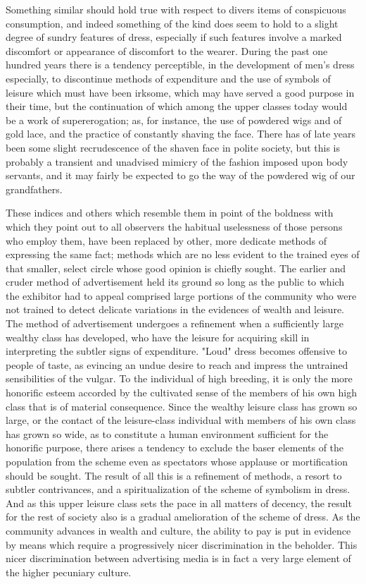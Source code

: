 \documentclass[12pt]{report}
\begin{document}
Something similar should hold true with respect to divers items of
conspicuous consumption, and indeed something of the kind does seem to
hold to a slight degree of sundry features of dress, especially if such
features involve a marked discomfort or appearance of discomfort to
the wearer. During the past one hundred years there is a tendency
perceptible, in the development of men's dress especially, to
discontinue methods of expenditure and the use of symbols of leisure
which must have been irksome, which may have served a good purpose in
their time, but the continuation of which among the upper classes today
would be a work of supererogation; as, for instance, the use of powdered
wigs and of gold lace, and the practice of constantly shaving the face.
There has of late years been some slight recrudescence of the shaven
face in polite society, but this is probably a transient and unadvised
mimicry of the fashion imposed upon body servants, and it may fairly be
expected to go the way of the powdered wig of our grandfathers.

These indices and others which resemble them in point of the boldness
with which they point out to all observers the habitual uselessness
of those persons who employ them, have been replaced by other, more
dedicate methods of expressing the same fact; methods which are no less
evident to the trained eyes of that smaller, select circle whose
good opinion is chiefly sought. The earlier and cruder method of
advertisement held its ground so long as the public to which the
exhibitor had to appeal comprised large portions of the community who
were not trained to detect delicate variations in the evidences of
wealth and leisure. The method of advertisement undergoes a refinement
when a sufficiently large wealthy class has developed, who have the
leisure for acquiring skill in interpreting the subtler signs of
expenditure. "Loud" dress becomes offensive to people of taste,
as evincing an undue desire to reach and impress the untrained
sensibilities of the vulgar. To the individual of high breeding, it is
only the more honorific esteem accorded by the cultivated sense of the
members of his own high class that is of material consequence. Since
the wealthy leisure class has grown so large, or the contact of the
leisure-class individual with members of his own class has grown so
wide, as to constitute a human environment sufficient for the honorific
purpose, there arises a tendency to exclude the baser elements of
the population from the scheme even as spectators whose applause or
mortification should be sought. The result of all this is a refinement
of methods, a resort to subtler contrivances, and a spiritualization of
the scheme of symbolism in dress. And as this upper leisure class sets
the pace in all matters of decency, the result for the rest of society
also is a gradual amelioration of the scheme of dress. As the community
advances in wealth and culture, the ability to pay is put in evidence
by means which require a progressively nicer discrimination in the
beholder. This nicer discrimination between advertising media is in fact
a very large element of the higher pecuniary culture.
\end{document}
